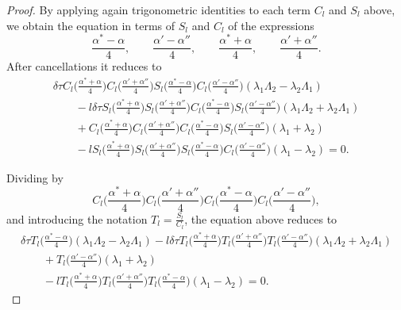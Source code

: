 \documentclass[pdftex]{sigma}
\numberwithin{equation}{section}
\begin{document}
\begin{proof}
 By applying again trigonometric identities
 to each term $C_l$ and $S_l$ above, we obtain the equation in terms of $S_l$ and $C_l$ of the expressions
\[
\frac{\alpha^*-\alpha}{4}, \qquad
\frac{\alpha'-\alpha''}{4},
\qquad
\frac{\alpha^*+\alpha}{4}, \qquad
\frac{\alpha'+\alpha''}{4}.
\]
After cancellations it reduces to
\begin{gather*}
\delta\tau C_l\biggl(\frac{\alpha^*+\alpha}{4}\biggr) C_l\biggl(\frac{\alpha'+\alpha''}{4}\biggr)
S_l\biggl(\frac{\alpha^*-\alpha}{4}\biggr)C_l\biggl(\frac{\alpha'-\alpha''}{4}\biggr)(\lambda_1\Lambda_2-\lambda_2\Lambda_1)\\
\qquad{} -l \delta\tau S_l\biggl(\frac{\alpha^*+\alpha}{4}\biggr) S_l\biggl(\frac{\alpha'+\alpha''}{4}\biggr)
C_l\biggl(\frac{\alpha^*-\alpha}{4}\biggr)S_l\biggl(\frac{\alpha'-\alpha''}{4}\biggr)(\lambda_1\Lambda_2+\lambda_2\Lambda_1)\\
\qquad{} + C_l\biggl(\frac{\alpha^*+\alpha}{4}\biggr) C_l\biggl(\frac{\alpha'+\alpha''}{4}\biggr)
C_l\biggl(\frac{\alpha^*-\alpha}{4}\biggr)S_l\biggl(\frac{\alpha'-\alpha''}{4}\biggr) (\lambda_1+\lambda_2)\\
\qquad{} -lS_l\biggl(\frac{\alpha^*+\alpha}{4}\biggr) S_l\biggl(\frac{\alpha'+\alpha''}{4}\biggr)
S_l\biggl(\frac{\alpha^*-\alpha}{4}\biggr)C_l\biggl(\frac{\alpha'-\alpha''}{4}\biggr) (\lambda_1-\lambda_2)=0.
\end{gather*}

Dividing by
\[
C_l\biggl(\frac{\alpha^*+\alpha}{4}\biggr) C_l\biggl(\frac{\alpha'+\alpha''}{4}\biggr)C_l\biggl(\frac{\alpha^*-\alpha}{4}\biggr)C_l\biggl(\frac{\alpha'-\alpha''}{4}\biggr),
\]
and introducing the notation $T_l=\displaystyle \frac{S_l}{C_l}$, the equation above reduces to
\begin{gather}
 \delta\tau T_l\biggl(\frac{\alpha^*-\alpha}{4}\biggr)(\lambda_1\Lambda_2-\lambda_2\Lambda_1)
 -l\delta\tau T_l\biggl(\frac{\alpha^*+\alpha}{4}\biggr)T_l\biggl( \frac{\alpha'+\alpha''}{4}\biggr)
T_l\biggl(\frac{\alpha'-\alpha''}{4}\biggr) (\lambda_1\Lambda_2+\lambda_2\Lambda_1) \nonumber\\
\qquad{} +T_l\biggl(\frac{\alpha'-\alpha''}{4}\biggr)(\lambda_1+\lambda_2) \nonumber\\
\qquad{} - lT_l\biggl(\frac{\alpha^*+\alpha}{4} \biggr)T_l\biggl(\frac{\alpha'+\alpha''}{4}\biggr)T_l\biggl(\frac{\alpha^*-\alpha}{4}\biggr)(\lambda_1-\lambda_2)=0.\label{Tl}
\end{gather}


\end{proof}
\end{document}
